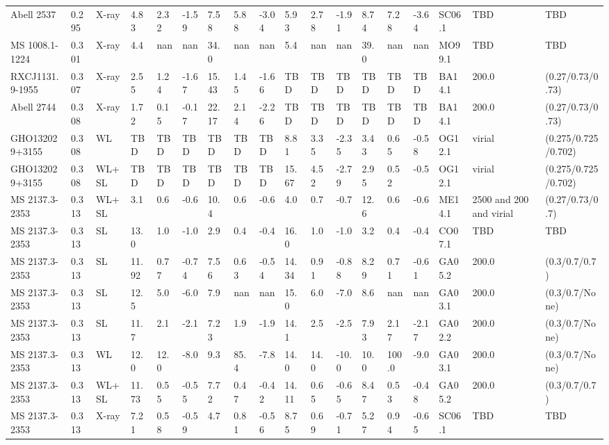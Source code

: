 \documentclass{article}
\begin{document}
\begin{center}
\begin{landscape}
\begin{longtable}{llllllllllllllllll}
Abell 2537 & 0.295 & X-ray & 4.83 & 2.32 & -1.59 & 7.58 & 5.88 & -3.04 & 5.93 & 2.78 & -1.91 & 8.74 & 7.28 & -3.64 & SC06.1 & TBD & TBD \\
MS 1008.1-1224 & 0.301 & X-ray & 4.4 & nan & nan & 34.0 & nan & nan & 5.4 & nan & nan & 39.0 & nan & nan & MO99.1 & TBD & TBD \\
RXCJ1131.9-1955 & 0.307 & X-ray & 2.55 & 1.24 & -1.67 & 15.43 & 1.45 & -1.66 & TBD & TBD & TBD & TBD & TBD & TBD & BA14.1 & 200.0 & (0.27/0.73/0.73) \\
Abell 2744 & 0.308 & X-ray & 1.72 & 0.15 & -0.17 & 22.17 & 2.14 & -2.26 & TBD & TBD & TBD & TBD & TBD & TBD & BA14.1 & 200.0 & (0.27/0.73/0.73) \\
GHO132029+3155 & 0.308 & WL & TBD & TBD & TBD & TBD & TBD & TBD & 8.81 & 3.35 & -2.35 & 3.43 & 0.65 & -0.58 & OG12.1 & virial & (0.275/0.725/0.702) \\
GHO132029+3155 & 0.308 & WL+SL & TBD & TBD & TBD & TBD & TBD & TBD & 15.67 & 4.52 & -2.79 & 2.95 & 0.52 & -0.5 & OG12.1 & virial & (0.275/0.725/0.702) \\
MS 2137.3-2353 & 0.313 & WL+SL & 3.1 & 0.6 & -0.6 & 10.4 & 0.6 & -0.6 & 4.0 & 0.7 & -0.7 & 12.6 & 0.6 & -0.6 & ME14.1 & 2500 and 200 and virial & (0.27/0.73/0.7) \\
MS 2137.3-2353 & 0.313 & SL & 13.0 & 1.0 & -1.0 & 2.9 & 0.4 & -0.4 & 16.0 & 1.0 & -1.0 & 3.2 & 0.4 & -0.4 & CO07.1 & TBD & TBD \\
MS 2137.3-2353 & 0.313 & SL & 11.92 & 0.77 & -0.74 & 7.56 & 0.63 & -0.54 & 14.34 & 0.91 & -0.88 & 8.29 & 0.71 & -0.61 & GA05.2 & 200.0 & (0.3/0.7/0.7) \\
MS 2137.3-2353 & 0.313 & SL & 12.5 & 5.0 & -6.0 & 7.9 & nan & nan & 15.0 & 6.0 & -7.0 & 8.6 & nan & nan & GA03.1 & 200.0 & (0.3/0.7/None) \\
MS 2137.3-2353 & 0.313 & SL & 11.7 & 2.1 & -2.1 & 7.23 & 1.9 & -1.9 & 14.1 & 2.5 & -2.5 & 7.93 & 2.17 & -2.17 & GA02.2 & 200.0 & (0.3/0.7/None) \\
MS 2137.3-2353 & 0.313 & WL & 12.0 & 12.0 & -8.0 & 9.3 & 85.4 & -7.8 & 14.0 & 14.0 & -10.0 & 10.0 & 100.0 & -9.0 & GA03.1 & 200.0 & (0.3/0.7/None) \\
MS 2137.3-2353 & 0.313 & WL+SL & 11.73 & 0.55 & -0.55 & 7.72 & 0.47 & -0.42 & 14.11 & 0.65 & -0.65 & 8.47 & 0.53 & -0.48 & GA05.2 & 200.0 & (0.3/0.7/0.7) \\
MS 2137.3-2353 & 0.313 & X-ray & 7.21 & 0.58 & -0.59 & 4.7 & 0.81 & -0.56 & 8.75 & 0.69 & -0.71 & 5.27 & 0.94 & -0.65 & SC06.1 & TBD & TBD \\

\end{longtable}
\end{landscape}
\end{center}
\end{document}
